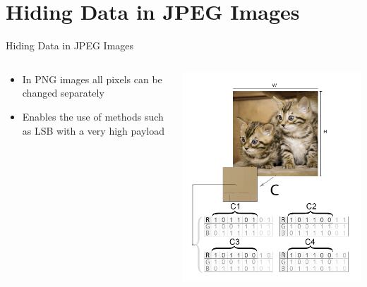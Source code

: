 \section{Hiding Data in JPEG Images}
\begin{frame}{Hiding Data in JPEG Images}{}
	\begin{minipage}[0.5\textheight]{\textwidth}
		\begin{columns}[T]
			\begin{column}{0.5\textwidth}
				\begin{itemize}
					\item In PNG images all pixels can be changed separately
					\item Enables the use of methods such as LSB with a very high payload
				\end{itemize}
			\end{column}
			\begin{column}{0.5\textwidth}
				\includegraphics[width=\textwidth]{figures/pngImage.png}
			\end{column}
		\end{columns}
	\end{minipage}
\end{frame}
